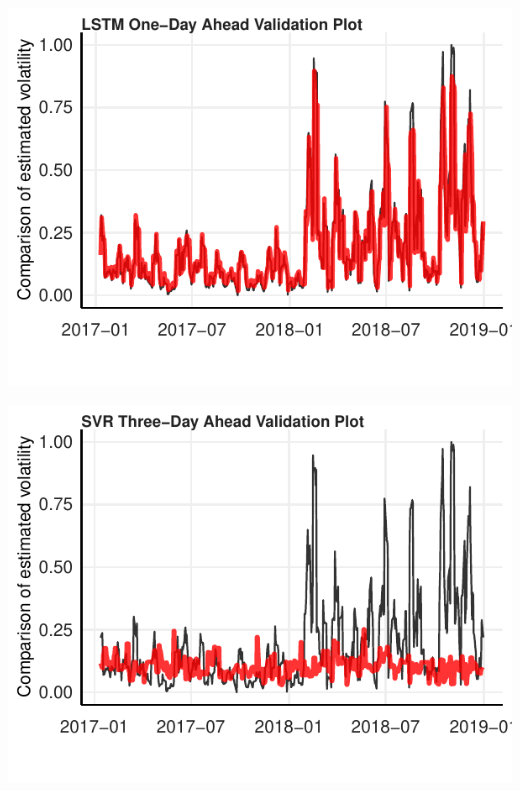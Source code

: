 \documentclass[11pt,preprint, authoryear]{elsarticle}
\let\origfigure\figure
\let\endorigfigure\endfigure
\renewenvironment{figure}[1][2] {
    \expandafter\origfigure\expandafter[H]
} {
    \endorigfigure
}
\numberwithin{equation}{section}
\numberwithin{figure}{section}
\numberwithin{table}{section}
\begin{document}
\begin{figure}[H]

{\centering \includegraphics{Essay_files/figure-latex/plot_val-1} 

}

\caption{LSTM One-Day Ahead Validation Forecast \label{lstm_one}}\label{fig:plot_val}
\end{figure}

\begin{figure}[H]

{\centering \includegraphics{Essay_files/figure-latex/plot_val_3-1} 

}

\caption{SVR Three-Day Ahead Validation Forecast \label{svr_three}}\label{fig:plot_val_3}
\end{figure}
\end{document}
